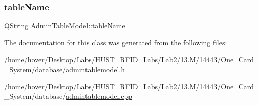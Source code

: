\mbox{\label{class_admin_table_model_aa0c4f5fa7a71cc6b253af2fd58f9d92c}} 
\subsubsection{\texorpdfstring{tableName}{tableName}}
{\footnotesize\ttfamily Q\+String Admin\+Table\+Model\+::table\+Name\hspace{0.3cm}{\ttfamily [private]}}



The documentation for this class was generated from the following files\+:\begin{DoxyCompactItemize}
\item 
/home/hover/\+Desktop/\+Labs/\+H\+U\+S\+T\+\_\+\+R\+F\+I\+D\+\_\+\+Labs/\+Lab2/13.\+M/14443/\+One\+\_\+\+Card\+\_\+\+System/database/\mbox{\hyperlink{admintablemodel_8h}{admintablemodel.\+h}}\item 
/home/hover/\+Desktop/\+Labs/\+H\+U\+S\+T\+\_\+\+R\+F\+I\+D\+\_\+\+Labs/\+Lab2/13.\+M/14443/\+One\+\_\+\+Card\+\_\+\+System/database/\mbox{\hyperlink{admintablemodel_8cpp}{admintablemodel.\+cpp}}\end{DoxyCompactItemize}
